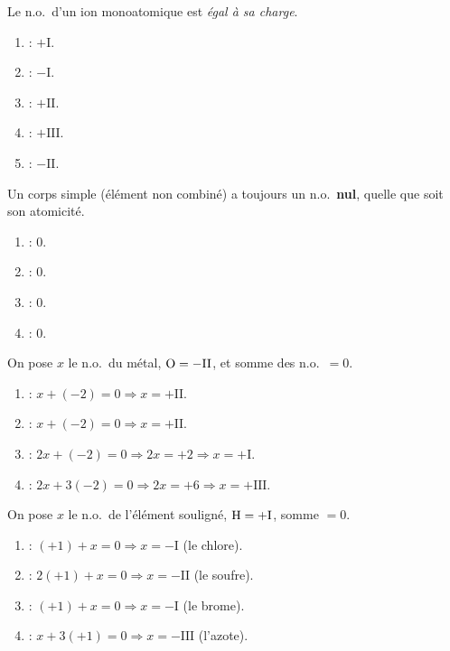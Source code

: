 \documentclass[11pt,a4paper]{article}
\begin{document}
\begin{corrige}
Le n.o.\ d'un ion monoatomique est \emph{égal à sa charge}.
\begin{enumerate}[label=\alph*)]
  \item {} : $+\mathrm{I}$.
  \item {} : $-\mathrm{I}$.
  \item {} : $+\mathrm{II}$.
  \item {} : $+\mathrm{III}$.
  \item {} : $-\mathrm{II}$.
\end{enumerate}
\end{corrige}

\begin{corrige}
Un corps simple (élément non combiné) a toujours un n.o.\ \textbf{nul}, quelle que soit son atomicité.
\begin{enumerate}[label=\alph*)]
  \item {} : $0$.
  \item {} : $0$.
  \item {} : $0$.
  \item {} : $0$.
\end{enumerate}
\end{corrige}

\begin{corrige}[appliquer « oxygène $=-\mathrm{II}$ » dans un oxyde neutre]
On pose $x$ le n.o.\ du métal, $\ce{O}=-\mathrm{II}$, et somme des n.o.\ $=0$.
\begin{enumerate}[label=\alph*)]
  \item {} : $x+(-2)=0 \Rightarrow x=+\mathrm{II}$.
  \item {} : $x+(-2)=0 \Rightarrow x=+\mathrm{II}$.
  \item {} : $2x+(-2)=0 \Rightarrow 2x=+2 \Rightarrow x=+\mathrm{I}$.
  \item {} : $2x+3(-2)=0 \Rightarrow 2x=+6 \Rightarrow x=+\mathrm{III}$.
\end{enumerate}
\end{corrige}

\begin{corrige}[appliquer « hydrogène $=+\mathrm{I}$ »]
On pose $x$ le n.o.\ de l'élément souligné, $\ce{H}=+\mathrm{I}$, somme $=0$.
\begin{enumerate}[label=\alph*)]
  \item {} : $(+1)+x=0 \Rightarrow x=-\mathrm{I}$ (le chlore).
  \item {} : $2(+1)+x=0 \Rightarrow x=-\mathrm{II}$ (le soufre).
  \item {} : $(+1)+x=0 \Rightarrow x=-\mathrm{I}$ (le brome).
  \item {} : $x+3(+1)=0 \Rightarrow x=-\mathrm{III}$ (l'azote).
\end{enumerate}
\end{corrige}
\end{document}

